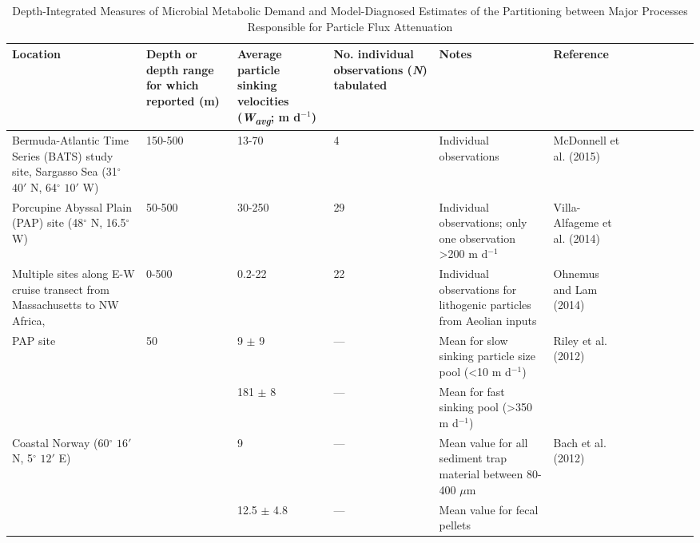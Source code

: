 \begin{landscape}
\begin{scriptsize}
\begin{singlespace}
\begin{flushleft}
\begin{longtable}{ Lp{.29\linewidth} Lp{.08\linewidth} Lp{.09\linewidth} Lp{.05\linewidth} Lp{.25\linewidth} Lp{.15\linewidth} }
\caption[Microbial Metabolic Demand and Partitioning between Processes Responsible for Particle Flux Attenuation]{Depth-Integrated Measures of Microbial Metabolic Demand and Model-Diagnosed Estimates of the Partitioning between Major Processes Responsible for Particle Flux Attenuation}
\label{table:acn1}
\endfirsthead
\endhead
\toprule
Location & Depth or depth range for which reported (m) & Average particle sinking velocities (\emph{W\textsubscript{avg}}; m d$^{-1}$) & No. individual observations (\emph{N}) tabulated & Notes & Reference \\
\midrule
Bermuda-Atlantic Time Series (BATS) study site, Sargasso Sea (31$^{\circ}$ $40'$ N, 64$^{\circ}$ $10'$ W) & 150-500 & 13-70 & 4 & Individual observations & McDonnell et al. (2015) \\

Porcupine Abyssal Plain (PAP) site (48$^{\circ}$ N, 16.5$^{\circ}$ W) & 50-500 & 30-250 & 29 & Individual observations; only one observation \textgreater 200 m d$^{-1}$ & Villa-Alfageme et al. (2014) \\

Multiple sites along E-W cruise transect from Massachusetts to NW Africa, & 0-500 & 0.2-22 & 22 & Individual observations for lithogenic particles from Aeolian inputs & Ohnemus and Lam (2014) \\

PAP site & 50 & 9 $\pm$ 9 & --- & Mean for slow sinking particle size pool (\textless 10 m d$^{-1}$) & Riley et al. (2012) \\
 &  & 181 $\pm$ 8 & --- & Mean for fast sinking pool (\textgreater 350 m d$^{-1}$) &  \\

Coastal Norway (60$^{\circ}$ $16'$ N, 5$^{\circ}$ $12'$ E) &  & 9 & --- & Mean value for all sediment trap material between 80-400 $\mu$m & Bach et al. (2012) \\

 &  & 12.5 $\pm$ 4.8 & --- & Mean value for fecal pellets &  \\


\end{longtable}
\end{flushleft}
\end{singlespace}
\end{scriptsize}
\end{landscape}
